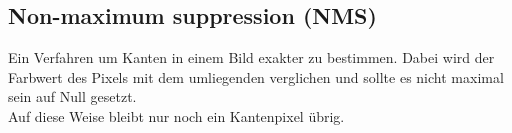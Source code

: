 \subsection{Non-maximum suppression  (NMS)}
Ein Verfahren um Kanten in einem Bild exakter zu bestimmen. Dabei wird der Farbwert des Pixels mit dem umliegenden verglichen und sollte es nicht maximal sein auf Null gesetzt.\\
Auf diese Weise bleibt nur noch ein Kantenpixel übrig. 